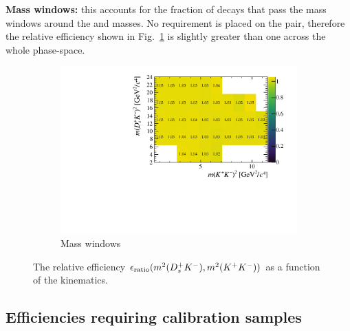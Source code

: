\begin{description}
\item \textbf{Mass windows:} this accounts for the fraction of decays that pass the mass windows around the \Dsp and \Dzb masses. No requirement is placed on the \Kp\Km pair, therefore the relative efficiency shown in Fig.~\ref{fig:B2DsKK_releff_masswindows} is slightly greater than one across the whole phase-space. 
\end{description}



\begin{figure}[!h]
   \centering
   \begin{subfigure}[t]{0.4\textwidth}
      \includegraphics[width=1.0\textwidth]{figs/B2DsKK/Relative_Eff_mass_All.pdf}
      \caption{Mass windows}
      \label{fig:B2DsKK_releff_masswindows}
   \end{subfigure}
   \caption{The relative efficiency $\epsilon_{\text{ratio}}(m^{2}({{D}^+_{s}}{{K}^-}),m^{2}({{K}^+}{{K}^-}))$ as a function of the \decay{\Bp}{\Dsp\Kp\Km} kinematics.}
   \label{fig:B2DsKK_dalitz_eff_two}
\end{figure}


\subsection{Efficiencies requiring calibration samples} 
\label{sec:B2DsKK_eff_from_calib}

